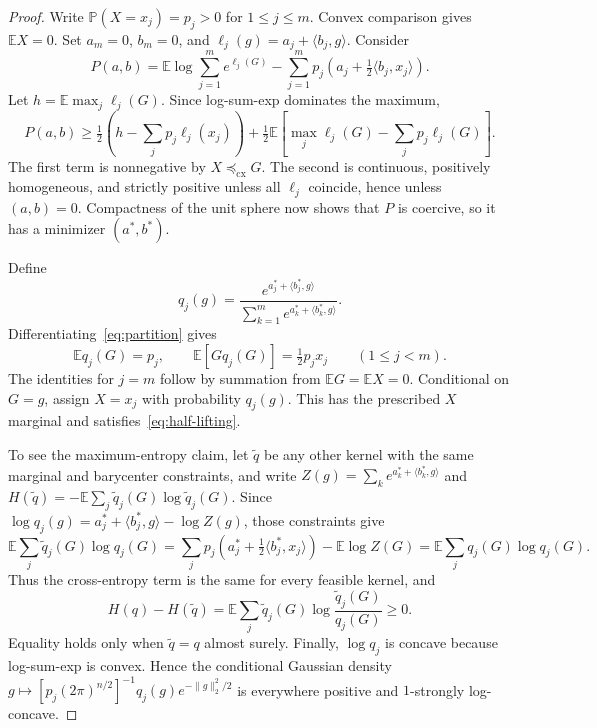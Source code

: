 \documentclass[11pt,reqno]{amsart}
\newcommand{\E}{\mathbb E}
\newcommand{\Pp}{\mathbb P}
\newcommand{\cx}{\preceq_{\mathrm{cx}}}
\newcommand{\ip}[2]{\langle #1,#2\rangle}
\begin{document}
\begin{proof}
Write $\Pp(X=x_j)=p_j>0$ for $1\leq j\leq m$.
Convex comparison gives $\E X=0$. Set $a_m=0$, $b_m=0$, and
$\ell_j(g)=a_j+\ip{b_j}{g}$. Consider
\begin{equation}\label{eq:partition}
 P(a,b)=
 \E\log\sum_{j=1}^m e^{\ell_j(G)}
 -\sum_{j=1}^mp_j
    \left(a_j+\tfrac12\ip{b_j}{x_j}\right).
\end{equation}
Let $h=\E\max_j\ell_j(G)$. Since log-sum-exp dominates the maximum,
\begin{equation}\label{eq:coercivity}
 P(a,b)\geq
 \tfrac12\left(h-\sum_jp_j\ell_j(x_j)\right)
 +\tfrac12\E\left[
     \max_j\ell_j(G)-\sum_jp_j\ell_j(G)
   \right].
\end{equation}
The first term is nonnegative by $X\cx G$. The second is continuous,
positively homogeneous, and strictly positive unless all $\ell_j$
coincide, hence unless $(a,b)=0$. Compactness of the unit sphere now
shows that $P$ is coercive, so it has a minimizer $(a^*,b^*)$.

Define
\begin{equation}\label{eq:gibbs}
 q_j(g)=
 \frac{e^{a_j^*+\ip{b_j^*}{g}}}
      {\sum_{k=1}^me^{a_k^*+\ip{b_k^*}{g}}}.
\end{equation}
Differentiating~\eqref{eq:partition} gives
\[
 \E q_j(G)=p_j,
 \qquad
 \E[Gq_j(G)]=\tfrac12p_jx_j
 \qquad(1\leq j<m).
\]
The identities for $j=m$ follow by summation from
$\E G=\E X=0$. Conditional on $G=g$, assign $X=x_j$ with
probability $q_j(g)$. This has the prescribed $X$ marginal and
satisfies~\eqref{eq:half-lifting}.

To see the maximum-entropy claim, let $\tilde q$ be any other kernel
with the same marginal and barycenter constraints, and write
$Z(g)=\sum_ke^{a_k^*+\ip{b_k^*}{g}}$ and
$H(\tilde q)=-\E\sum_j\tilde q_j(G)\log\tilde q_j(G)$.
Since $\log q_j(g)=a_j^*+\ip{b_j^*}{g}-\log Z(g)$, those
constraints give
\[
 \E\sum_j\tilde q_j(G)\log q_j(G)
 =\sum_jp_j\left(a_j^*+\tfrac12\ip{b_j^*}{x_j}\right)
   -\E\log Z(G)
 =\E\sum_jq_j(G)\log q_j(G).
\]
Thus the cross-entropy term is the same for every feasible kernel, and
\[
 H(q)-H(\tilde q)
 =\E\sum_j\tilde q_j(G)
       \log\frac{\tilde q_j(G)}{q_j(G)}\geq0.
\]
Equality holds only when $\tilde q=q$ almost surely. Finally,
$\log q_j$ is concave because log-sum-exp is convex. Hence the
conditional Gaussian density
$g\mapsto[p_j(2\pi)^{n/2}]^{-1}q_j(g)e^{-\|g\|_2^2/2}$
is everywhere positive and $1$-strongly log-concave.
\end{proof}
\end{document}
